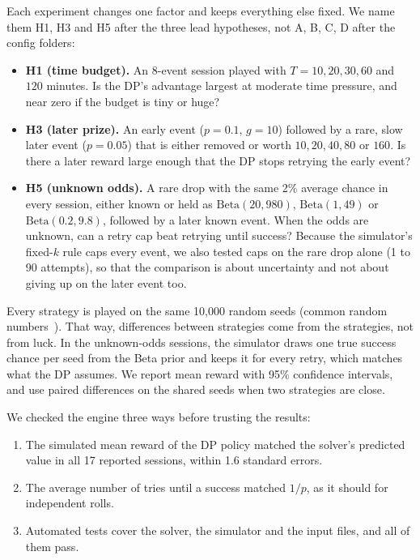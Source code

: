 \documentclass[11pt,a4paper]{article}
\begin{document}
Each experiment changes one factor and keeps everything else fixed. We name them H1, H3 and H5 after the three lead hypotheses, not A, B, C, D after the config folders:
\begin{itemize}
\item \textbf{H1 (time budget).} An 8-event session played with $T = 10, 20, 30, 60$ and $120$ minutes. Is the DP's advantage largest at moderate time pressure, and near zero if the budget is tiny or huge?
\item \textbf{H3 (later prize).} An early event ($p = 0.1$, $g = 10$) followed by a rare, slow later event ($p = 0.05$) that is either removed or worth $10, 20, 40, 80$ or $160$. Is there a later reward large enough that the DP stops retrying the early event?
\item \textbf{H5 (unknown odds).} A rare drop with the same 2\% average chance in every session, either known or held as $\mathrm{Beta}(20,980)$, $\mathrm{Beta}(1,49)$ or $\mathrm{Beta}(0.2,9.8)$, followed by a later known event. When the odds are unknown, can a retry cap beat retrying until success? Because the simulator's fixed-$k$ rule caps every event, we also tested caps on the rare drop alone (1 to 90 attempts), so that the comparison is about uncertainty and not about giving up on the later event too.
\end{itemize}

Every strategy is played on the same 10,000 random seeds (common random numbers~\cite{glasserman1992}). That way, differences between strategies come from the strategies, not from luck. In the unknown-odds sessions, the simulator draws one true success chance per seed from the Beta prior and keeps it for every retry, which matches what the DP assumes. We report mean reward with 95\% confidence intervals, and use paired differences on the shared seeds when two strategies are close.

We checked the engine three ways before trusting the results:
\begin{enumerate}
\item The simulated mean reward of the DP policy matched the solver's predicted value in all 17 reported sessions, within 1.6 standard errors.
\item The average number of tries until a success matched $1/p$, as it should for independent rolls.
\item Automated tests cover the solver, the simulator and the input files, and all of them pass.
\end{enumerate}
\end{document}
